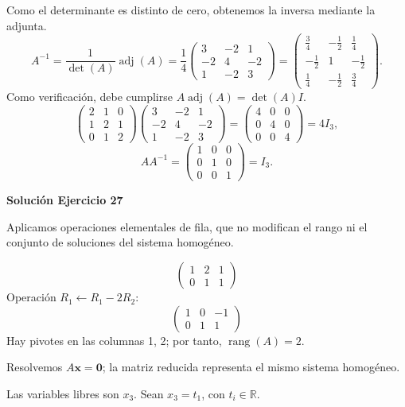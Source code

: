 \documentclass[12pt]{article}
\newcommand{\rang}{\operatorname{rang}}
\newcommand{\adj}{\operatorname{adj}}
\newcommand{\vect}[1]{\boldsymbol{#1}}
\begin{document}
Como el determinante es distinto de cero, obtenemos la inversa mediante la adjunta.
\[
A^{-1}=\frac1{\det(A)}\adj(A)=\frac1{4}\begin{pmatrix}3&-2&1\\-2&4&-2\\1&-2&3\end{pmatrix}=\begin{pmatrix}\frac{3}{4}&- \frac{1}{2}&\frac{1}{4}\\- \frac{1}{2}&1&- \frac{1}{2}\\\frac{1}{4}&- \frac{1}{2}&\frac{3}{4}\end{pmatrix}.
\]
Como verificación, debe cumplirse $A\adj(A)=\det(A)I$.
\[
\begin{pmatrix}2&1&0\\1&2&1\\0&1&2\end{pmatrix}\begin{pmatrix}3&-2&1\\-2&4&-2\\1&-2&3\end{pmatrix}=\begin{pmatrix}4&0&0\\0&4&0\\0&0&4\end{pmatrix}=4I_{3},
\]
\[
AA^{-1}=\begin{pmatrix}1&0&0\\0&1&0\\0&0&1\end{pmatrix}=I_{3}.
\]

\par\bigskip\noindent\textbf{Solución Ejercicio 27}\par\nobreak
Aplicamos operaciones elementales de fila, que no modifican el rango ni el conjunto de soluciones del sistema homogéneo.

\[
\begin{pmatrix}1&2&1\\0&1&1\end{pmatrix}
\]
Operación $R_{1}\leftarrow R_{1}-2R_{2}$:
\[
\begin{pmatrix}1&0&-1\\0&1&1\end{pmatrix}
\]
Hay pivotes en las columnas 1, 2; por tanto, $\boxed{\rang(A)=2}$.

Resolvemos $A\vect x=\vect0$; la matriz reducida representa el mismo sistema homogéneo.

Las variables libres son $x_{3}$. Sean $x_{3}=t_{1}$, con $t_i\in\mathbb R$.
\end{document}
